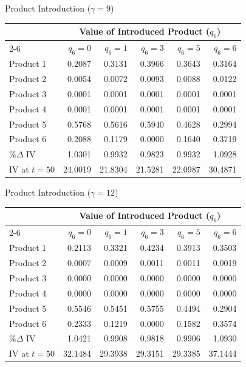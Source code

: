 \documentclass[aspectratio=169,professionalfonts]{beamer}
\begin{document}
\begin{frame}{Product Introduction ($\gamma = 9$)}
\begin{center}
\scriptsize
\setlength{\tabcolsep}{5pt}
\begin{tabular}{lrrrrr}
  \toprule
  & \multicolumn{5}{c}{Value of Introduced Product ($q_6$)} \\
  \cmidrule(lr){2-6}
  & $q_6=0$ & $q_6=1$ & $q_6=3$ & $q_6=5$ & $q_6=6$ \\
  \midrule
  Product 1        & 0.2087  & 0.3131  & 0.3966  & 0.3643  & 0.3164  \\
  Product 2        & 0.0054  & 0.0072  & 0.0093  & 0.0088  & 0.0122  \\
  Product 3        & 0.0001  & 0.0001  & 0.0001  & 0.0001  & 0.0001  \\
  Product 4        & 0.0001  & 0.0001  & 0.0001  & 0.0001  & 0.0001  \\
  Product 5        & 0.5768  & 0.5616  & 0.5940  & 0.4628  & 0.2994  \\
  Product 6        & 0.2088  & 0.1179  & 0.0000  & 0.1640  & 0.3719  \\
  \midrule
  $\%\Delta$ IV    & 1.0301  & 0.9932  & 0.9823  & 0.9932  & 1.0928  \\
  IV at $t=50$     & 24.0019 & 21.8304 & 21.5281 & 22.0987 & 30.4871 \\
  \bottomrule
\end{tabular}
\end{center}
\end{frame}

\begin{frame}{Product Introduction ($\gamma = 12$)}
\begin{center}
\scriptsize
\setlength{\tabcolsep}{5pt}
\begin{tabular}{lrrrrr}
  \toprule
  & \multicolumn{5}{c}{Value of Introduced Product ($q_6$)} \\
  \cmidrule(lr){2-6}
  & $q_6=0$ & $q_6=1$ & $q_6=3$ & $q_6=5$ & $q_6=6$ \\
  \midrule
  Product 1        & 0.2113  & 0.3321  & 0.4234  & 0.3913  & 0.3503  \\
  Product 2        & 0.0007  & 0.0009  & 0.0011  & 0.0011  & 0.0019  \\
  Product 3        & 0.0000  & 0.0000  & 0.0000  & 0.0000  & 0.0000  \\
  Product 4        & 0.0000  & 0.0000  & 0.0000  & 0.0000  & 0.0000  \\
  Product 5        & 0.5546  & 0.5451  & 0.5755  & 0.4494  & 0.2904  \\
  Product 6        & 0.2333  & 0.1219  & 0.0000  & 0.1582  & 0.3574  \\
  \midrule
  $\%\Delta$ IV    & 1.0421  & 0.9908  & 0.9818  & 0.9906  & 1.0930  \\
  IV at $t=50$     & 32.1484 & 29.3938 & 29.3151 & 29.3385 & 37.1444 \\
  \bottomrule
\end{tabular}
\end{center}
\end{frame}
\end{document}
